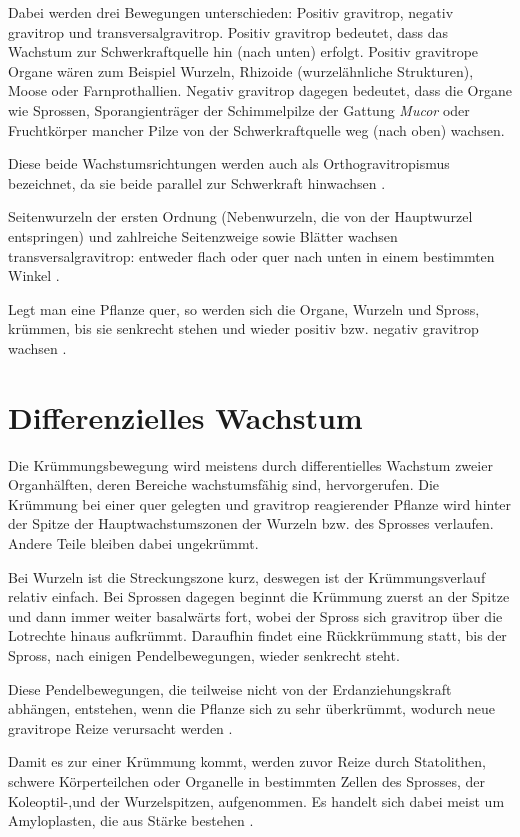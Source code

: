 \documentclass[
a4paper, 
11pt, 
ngerman,
listof=totoc,
bibliography=totocnumbered,
abstracton
]{scrreprt}
\begin{document}
Dabei werden drei Bewegungen unterschieden: Positiv gravitrop, negativ gravitrop und transversalgravitrop.
Positiv gravitrop bedeutet, dass das Wachstum zur Schwerkraftquelle hin (nach unten) erfolgt.
Positiv gravitrope Organe wären zum Beispiel Wurzeln, Rhizoide (wurzelähnliche Strukturen), Moose oder Farnprothallien.
Negativ gravitrop dagegen bedeutet, dass die Organe wie Sprossen, Sporangienträger der Schimmelpilze der Gattung \emph{Mucor} oder Fruchtkörper mancher Pilze von der Schwerkraftquelle weg (nach oben) wachsen.

Diese beide Wachstumsrichtungen werden auch als Orthogravitropismus bezeichnet, da sie beide parallel zur Schwerkraft hinwachsen \parencite[546]{Jacob}.

Seitenwurzeln der ersten Ordnung (Nebenwurzeln, die von der Hauptwurzel entspringen) und zahlreiche Seitenzweige sowie Blätter wachsen transversalgravitrop: entweder flach oder quer nach unten in einem bestimmten Winkel \parencite[449]{Strasburger}. 

Legt man eine Pflanze quer, so werden sich die Organe, Wurzeln und Spross, krümmen, bis sie senkrecht stehen und wieder positiv bzw. negativ gravitrop wachsen
\parencite[528]{Luettge}.

\section{Differenzielles Wachstum}

Die Krümmungsbewegung wird meistens durch differentielles Wachstum zweier Organhälften, deren Bereiche wachstumsfähig sind, hervorgerufen.
Die Krümmung bei einer quer gelegten und gravitrop reagierender Pflanze wird hinter der Spitze der Hauptwachstumszonen der Wurzeln bzw. des Sprosses verlaufen. Andere Teile bleiben dabei ungekrümmt.

Bei Wurzeln ist die Streckungszone kurz, deswegen ist der Krümmungsverlauf relativ einfach. Bei Sprossen dagegen beginnt die Krümmung zuerst an der Spitze und dann immer weiter basalwärts fort, wobei der Spross sich gravitrop über die Lotrechte hinaus aufkrümmt. Daraufhin findet eine Rückkrümmung statt, bis der Spross, nach einigen Pendelbewegungen, wieder senkrecht steht.

Diese Pendelbewegungen, die teilweise nicht von der Erdanziehungskraft abhängen, entstehen, wenn die Pflanze sich zu sehr überkrümmt, wodurch neue gravitrope Reize verursacht werden \parencite[450f]{Strasburger}.

Damit es zur einer Krümmung kommt, werden zuvor Reize durch Statolithen, schwere Körperteilchen oder Organelle in bestimmten Zellen des Sprosses, der Koleoptil-,und der Wurzelspitzen, aufgenommen. Es handelt sich dabei meist um Amyloplasten, die aus Stärke bestehen \parencite[530]{Luettge}.
\end{document}
